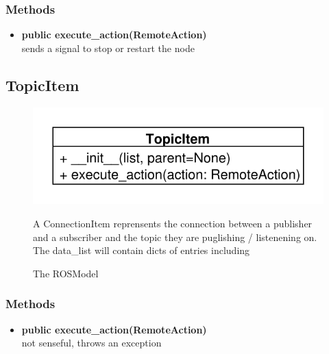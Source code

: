 \subsubsection{Methods}
\begin{itemize}
  \item \textbf{public execute\_action(RemoteAction)}\\
  sends a signal to stop or restart the node
\end{itemize}

\subsection{TopicItem}
\begin{figure}[htbp]
	\begin{minipage}[t]{7cm}
		\vspace{0pt}
		\centering
		\includegraphics[scale=0.6]{./diagram_pictures/TopicItem.pdf}
		\caption{The ROSModel}
	\end{minipage}
	\hfill
	\begin{minipage}[t]{8cm}
		\vspace{10pt}
		A ConnectionItem reprensents the connection between a publisher and a
		subscriber and the topic they are puglishing / listenening on.
		The data\_list will contain dicts of entries including 
	\end{minipage}
\end{figure} 
\subsubsection{Methods}
\begin{itemize}
  \item \textbf{public execute\_action(RemoteAction)}\\ 
  not senseful, throws an exception
\end{itemize}

